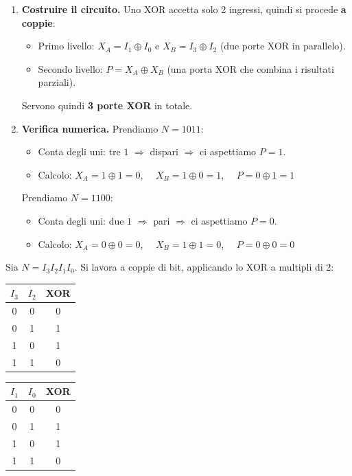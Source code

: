 \documentclass[11pt,a4paper]{report}
\begin{document}
\begin{enumerate}[leftmargin=1.5em]
    \item \textbf{Costruire il circuito.} Uno XOR accetta solo 2 ingressi, quindi si procede \textbf{a coppie}:
    \begin{itemize}
        \item Primo livello: $X_A = I_1 \oplus I_0$ e $X_B = I_3 \oplus I_2$ (due porte XOR in parallelo).
        \item Secondo livello: $P = X_A \oplus X_B$ (una porta XOR che combina i risultati parziali).
    \end{itemize}
    Servono quindi \textbf{3 porte XOR} in totale.

    \item \textbf{Verifica numerica.} Prendiamo $N = 1011$:
    \begin{itemize}
        \item Conta degli uni: tre $1$ $\Rightarrow$ dispari $\Rightarrow$ ci aspettiamo $P = 1$.
        \item Calcolo: $X_A = 1 \oplus 1 = 0$, $\quad X_B = 1 \oplus 0 = 1$, $\quad P = 0 \oplus 1 = 1$ \checkmark
    \end{itemize}
    Prendiamo $N = 1100$:
    \begin{itemize}
        \item Conta degli uni: due $1$ $\Rightarrow$ pari $\Rightarrow$ ci aspettiamo $P = 0$.
        \item Calcolo: $X_A = 0 \oplus 0 = 0$, $\quad X_B = 1 \oplus 1 = 0$, $\quad P = 0 \oplus 0 = 0$ \checkmark
    \end{itemize}
\end{enumerate}

\medskip
\noindent Sia $N = I_3 I_2 I_1 I_0$. Si lavora a coppie di bit, applicando lo XOR a multipli di 2:

\begin{center}
\begin{tabular}{cc|c}
\toprule
$I_3$ & $I_2$ & XOR\\
\midrule
0&0&0\\
0&1&1\\
1&0&1\\
1&1&0\\
\bottomrule
\end{tabular}
\qquad
\begin{tabular}{cc|c}
\toprule
$I_1$ & $I_0$ & XOR\\
\midrule
0&0&0\\
0&1&1\\
1&0&1\\
1&1&0\\
\bottomrule
\end{tabular}
\end{center}
\end{document}
